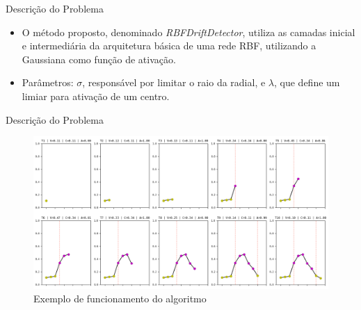 \documentclass[10pt]{beamer}
\begin{document}
\begin{frame}{Descrição do Problema}
    \begin{itemize}
        \item<1 -> O método proposto, denominado \textit{RBFDriftDetector}, utiliza as camadas inicial e intermediária da arquitetura básica de uma rede RBF, utilizando a Gaussiana como função de ativação.
        \item<2 -> Parâmetros: \textit{$\sigma$}, responsável por limitar o raio da radial, e \textit{$\lambda$}, que define um limiar para ativação de um centro.
      \end{itemize}
\end{frame}
 

\begin{frame}{Descrição do Problema}
    \begin{figure}[H]
        \begin{center}
            \includegraphics[width=\textwidth]{../text/imagens/funcionamento_algoritmo.png}
            \caption{Exemplo de funcionamento do algoritmo}
            \label{fig:funcionamento_algoritmo}
        \end{center}
    \end{figure}
\end{frame}

\end{document}
